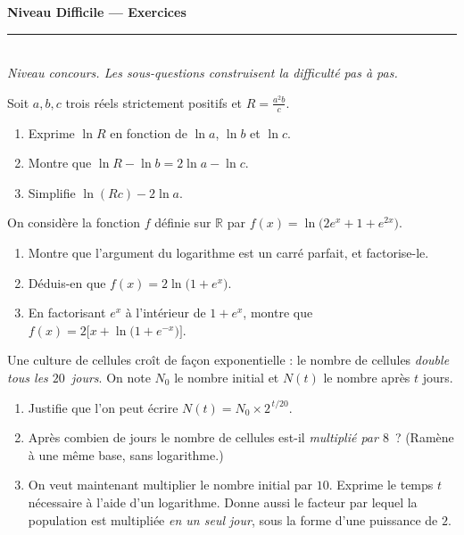 \documentclass[11pt,a4paper]{article}
\newcommand{\R}{\mathbb{R}}
\newcommand{\ds}{\displaystyle}
\begin{document}
\begin{center}
{\LARGE\bfseries\color{primarydark} Niveau Difficile — Exercices}\\[2pt]
{\color{primary}\rule{0.45\textwidth}{1.2pt}}\\[3pt]
{\small\itshape Niveau concours. Les sous-questions construisent la difficulté pas à pas.}
\end{center}
\vspace{1mm}

\begin{exo}
Soit $a,b,c$ trois réels strictement positifs et $\ds R=\frac{a^{2}b}{c}$.
\begin{enumerate}[label=\textbf{\alph*)},leftmargin=2.2em,topsep=1pt,itemsep=2pt]
  \item Exprime $\ln R$ en fonction de $\ln a$, $\ln b$ et $\ln c$.
  \item Montre que $\ln R-\ln b=2\ln a-\ln c$.
  \item Simplifie $\ln(Rc)-2\ln a$.
\end{enumerate}
\end{exo}

\begin{exo}
On considère la fonction $f$ définie sur $\R$ par $f(x)=\ln\bigl(2e^{x}+1+e^{2x}\bigr)$.
\begin{enumerate}[label=\textbf{\alph*)},leftmargin=2.2em,topsep=1pt,itemsep=2pt]
  \item Montre que l'argument du logarithme est un carré parfait, et factorise-le.
  \item Déduis-en que $f(x)=2\ln\bigl(1+e^{x}\bigr)$.
  \item En factorisant $e^{x}$ à l'intérieur de $1+e^{x}$, montre que $f(x)=2\bigl[x+\ln\bigl(1+e^{-x}\bigr)\bigr]$.
\end{enumerate}
\end{exo}

\begin{exo}
Une culture de cellules croît de façon exponentielle : le nombre de cellules \emph{double tous les
$20$~jours}. On note $N_0$ le nombre initial et $N(t)$ le nombre après $t$ jours.
\begin{enumerate}[label=\textbf{\alph*)},leftmargin=2.2em,topsep=1pt,itemsep=2pt]
  \item Justifie que l'on peut écrire $\ds N(t)=N_0\times 2^{\,t/20}$.
  \item Après combien de jours le nombre de cellules est-il \emph{multiplié par $8$}~? (Ramène à une même base, sans logarithme.)
  \item On veut maintenant multiplier le nombre initial par $10$. Exprime le temps $t$ nécessaire à l'aide d'un logarithme. Donne aussi le facteur par lequel la population est multipliée \emph{en un seul jour}, sous la forme d'une puissance de $2$.
\end{enumerate}
\end{exo}
\end{document}
